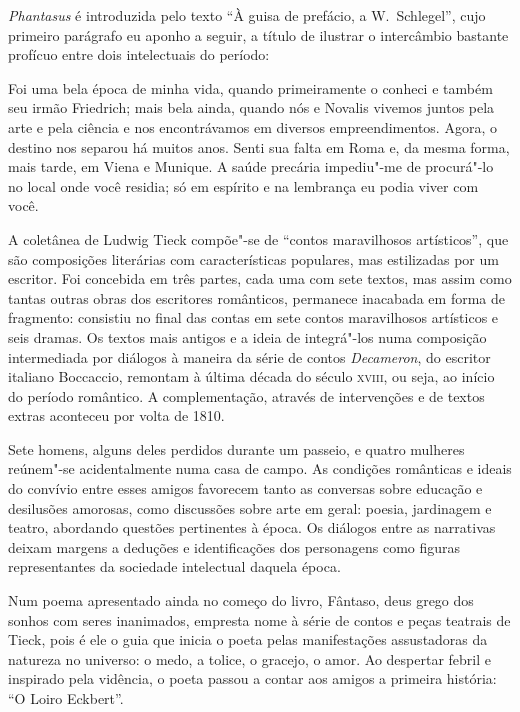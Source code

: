 \textit{Phantasus} é introduzida pelo texto ``À guisa de prefácio, 
a W.~Schlegel'', cujo primeiro parágrafo eu aponho a seguir, a título de
ilustrar o intercâmbio bastante profícuo entre dois intelectuais do período:

\begin{hedraquote}
Foi uma bela época de minha vida, quando primeiramente o conheci e
também seu irmão Friedrich; mais bela ainda, quando nós e Novalis
vivemos juntos pela arte e pela ciência e nos encontrávamos em diversos
empreendimentos. Agora, o destino nos separou há muitos anos. Senti sua
falta em Roma e, da mesma forma, mais tarde, em Viena e Munique. A
saúde precária impediu"-me de procurá"-lo no local onde você residia; só
em espírito e na lembrança eu podia viver com você.
\end{hedraquote}
  
A coletânea de Ludwig Tieck compõe"-se de ``contos maravilhosos artísticos'', que são
composições literárias com características populares, mas estilizadas
por um escritor. Foi concebida em três partes, cada uma com sete textos,
mas assim como tantas outras obras dos escritores românticos, permanece
inacabada em forma de fragmento: consistiu no final das contas em sete
contos maravilhosos artísticos e seis dramas. Os textos mais antigos e a ideia de
integrá"-los numa composição intermediada por diálogos à maneira da
série de contos \textit{Decameron}, do escritor italiano Boccaccio,		
remontam à última década do século \textsc{xviii}, ou seja, 
ao início do período romântico. A complementação, através de 
intervenções e de textos extras aconteceu por volta de 1810. 

Sete homens, alguns deles perdidos durante um passeio, e quatro mulheres
reúnem"-se acidentalmente numa casa de campo. As condições românticas e
ideais do convívio entre esses amigos favorecem tanto as conversas
sobre educação e desilusões amorosas, como discussões sobre arte em
geral: poesia, jardinagem e teatro, abordando questões pertinentes à
época. Os diálogos entre as narrativas deixam margens a deduções e
identificações dos personagens como figuras representantes da sociedade
intelectual daquela época. 

Num poema apresentado ainda no começo do livro, Fântaso, deus grego dos
sonhos com seres inanimados, empresta nome à série de contos e peças
teatrais de Tieck, pois é ele o guia que inicia o poeta pelas
manifestações assustadoras da natureza no universo: o medo, a tolice, o
gracejo, o amor.  Ao despertar febril e inspirado pela vidência, o
poeta passou a contar aos amigos a primeira história: ``O Loiro Eckbert''.

